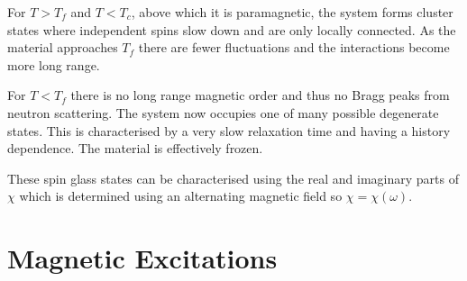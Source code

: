 \noindent For $T > T_f$ and $T < T_c$, above which it is paramagnetic, the system forms cluster states where independent spins slow down and are only locally connected. As the material approaches $T_f$ there are fewer fluctuations and the interactions become more long range.

\noindent For $T < T_f$ there is no long range magnetic order and thus no Bragg peaks from neutron scattering. The system now occupies one of many possible degenerate states. This is characterised by a very slow relaxation time and having a history dependence. The material is effectively frozen.

\noindent These spin glass states can be characterised using the real and imaginary parts of $\chi$ which is determined using an alternating magnetic field so $\chi = \chi(\omega)$. 

\section{Magnetic Excitations}